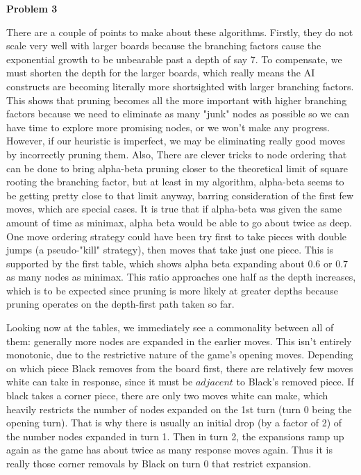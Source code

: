 \documentclass[12pt]{article}
\makeatletter
\newcommand{\exercise}[1]{\par\vspace{4ex}\normalfont\normalsize\noindent
\textbf{\large Problem #1}\par\nobreak\@afterindentfalse\@afterheading\vspace{.75ex}}
\makeatother
\begin{document}
\exercise{3}

There are a couple of points to make about these algorithms. Firstly, they do not scale very well with larger boards because the branching factors cause the exponential growth to be unbearable past a depth of say 7. To compensate, we must shorten the depth for the larger boards, which really means the AI constructs are becoming literally more shortsighted with larger branching factors. This shows that pruning becomes all the more important with higher branching factors because we need to eliminate as many "junk" nodes as possible so we can have time to explore more promising nodes, or we won't make any progress. However, if our heuristic is imperfect, we may be eliminating really good moves by incorrectly pruning them. Also, There are clever tricks to node ordering that can be done to bring alpha-beta pruning closer to the theoretical limit of square rooting the branching factor, but at least in my algorithm, alpha-beta seems to be getting pretty close to that limit anyway, barring consideration of the first few moves, which are special cases. It is true that if alpha-beta was given the same amount of time as minimax, alpha beta would be able to go about twice as deep. One move ordering strategy could have been try first to take pieces with double jumps (a pseudo-"kill" strategy), then moves that take just one piece. This is supported by the first table, which shows alpha beta expanding about $0.6$ or $0.7$ as many nodes as minimax. This ratio approaches one half as the depth increases, which is to be expected since pruning is more likely at greater depths because pruning operates on the depth-first path taken so far. 

Looking now at the tables, we immediately see a commonality between all of them: generally more nodes are expanded in the earlier moves. This isn't entirely monotonic, due to the restrictive nature of the game's opening moves. Depending on which piece Black removes from the board first, there are relatively few moves white can take in response, since it must be $adjacent$ to Black's removed piece. If black takes a corner piece, there are only two moves white can make, which heavily restricts the number of nodes expanded on the 1st turn (turn 0 being the opening turn). That is why there is usually an initial drop (by a factor of 2) of the number nodes expanded in turn 1. Then in turn 2, the expansions ramp up again as the game has about twice as many response moves again. Thus it is really those corner removals by Black on turn 0 that restrict expansion. 
\end{document}
